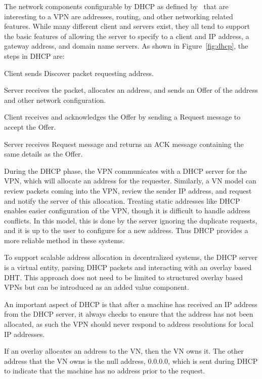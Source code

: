 The network components configurable by DHCP as defined by~\cite{dhcp0,dhcp1}
that are interesting to a VPN are addresses, routing, and other networking
related features.  While many different client and servers exist, they all tend
to support the basic features of allowing the server to specify to a client and
IP address, a gateway address, and domain name servers.  As shown in
Figure~\ref{fig:dhcp}, the steps in DHCP are:
\begin{enumerate}
\small{
\setlength{\itemsep}{0pt}
\setlength{\parskip}{0pt}
\item Client sends Discover packet requesting address.
\item Server receives the packet, allocates an address, and sends an Offer of
the address and other network configuration.
\item Client receives and acknowledges the Offer by sending a Request message
to accept the Offer.
\item Server receives Request message and returns an ACK message containing
the same details as the Offer.
}
\end{enumerate}

During the DHCP phase, the VPN communicates with a DHCP server for the VPN,
which will allocate an address for the requester.  Similarly, a VN model can
review packets coming into the VPN, review the sender IP address, and request
and notify the server of this allocation.  Treating static addresses like
DHCP enables easier configuration of the VPN, though it is difficult to handle
address conflicts.  In this model, this is done by the server ignoring the
duplicate requests, and it is up to the user to configure for a new address.
Thus DHCP provides a more reliable method in these systems.

To support scalable address allocation in decentralized systems, the
DHCP server is a virtual entity, parsing DHCP packets and interacting with
an overlay based DHT.  This approach does not need to be limited to structured
overlay based VPNs but can be introduced as an added value component.

An important aspect of DHCP is that after a machine has received an IP address
from the DHCP server, it always checks to ensure that the address has not been
allocated, as such the VPN should never respond to address resolutions for
local IP addresses.

If an overlay allocates an address to the VN, then the VN owns it.  The other
address that the VN owns is the null address, 0.0.0.0, which is sent during
DHCP to indicate that the machine has no address prior to the request.

